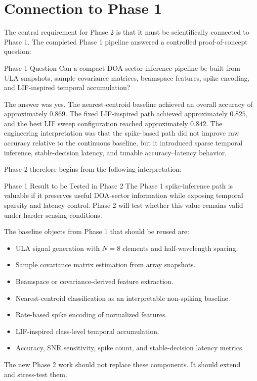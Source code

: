 \section{Connection to Phase 1}

The central requirement for Phase 2 is that it must be scientifically connected to Phase 1. The completed Phase 1 pipeline answered a controlled proof-of-concept question:

\begin{proposalbox}{Phase 1 Question}
Can a compact DOA-sector inference pipeline be built from ULA snapshots, sample covariance matrices, beamspace features, spike encoding, and LIF-inspired temporal accumulation?
\end{proposalbox}

The answer was yes. The nearest-centroid baseline achieved an overall accuracy of approximately \(0.869\). The fixed LIF-inspired path achieved approximately \(0.825\), and the best LIF sweep configuration reached approximately \(0.842\). The engineering interpretation was that the spike-based path did not improve raw accuracy relative to the continuous baseline, but it introduced sparse temporal inference, stable-decision latency, and tunable accuracy--latency behavior.

Phase 2 therefore begins from the following interpretation:

\begin{resultbox}{Phase 1 Result to be Tested in Phase 2}
The Phase 1 spike-inference path is valuable if it preserves useful DOA-sector information while exposing temporal sparsity and latency control. Phase 2 will test whether this value remains valid under harder sensing conditions.
\end{resultbox}

The baseline objects from Phase 1 that should be reused are:

\begin{itemize}
    \item ULA signal generation with \(N=8\) elements and half-wavelength spacing.
    \item Sample covariance matrix estimation from array snapshots.
    \item Beamspace or covariance-derived feature extraction.
    \item Nearest-centroid classification as an interpretable non-spiking baseline.
    \item Rate-based spike encoding of normalized features.
    \item LIF-inspired class-level temporal accumulation.
    \item Accuracy, SNR sensitivity, spike count, and stable-decision latency metrics.
\end{itemize}

The new Phase 2 work should not replace these components. It should extend and stress-test them.
